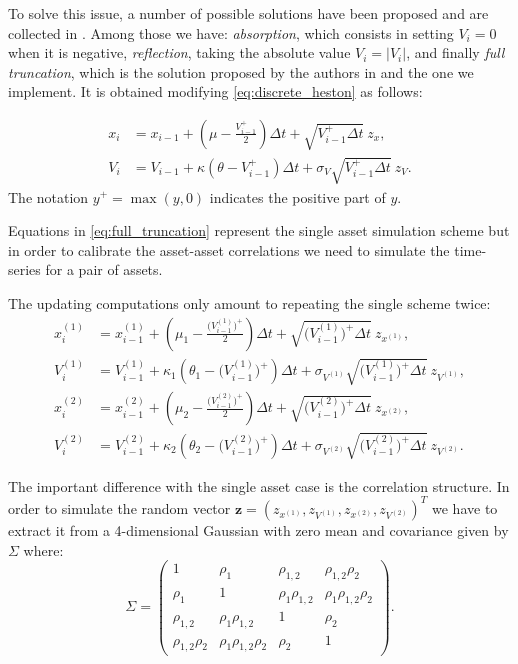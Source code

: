 To solve this issue, a number of possible solutions have been proposed and are collected in \citep{LORD2010}. Among those we have:
\textit{absorption}, which consists in setting $V_i = 0$ when it is negative, \textit{reflection}, taking the absolute value $V_i = |V_i|$, and finally \textit{full truncation}, which is the solution proposed  by the authors in \citep{LORD2010} and the one we  implement. It is obtained modifying \eqref{eq:discrete_heston} as follows:

\begin{subequations}
	\label{eq:full_truncation}
	\begin{align}
	x_i &= x_{i-1} + (\mu -  \frac{V_{i-1}^+}{2})\Delta t + \sqrt{V_{i-1}^+ \Delta t} \:z_x, \\
	V_i &= V_{i-1} + \kappa(\theta - V_{i-1}^+ )\Delta t + \sigma_V \sqrt{V_{i-1}^+ \Delta t} \: z_V.
	\end{align}
\end{subequations}
The notation $y^+ = \max(y, 0)$ indicates the positive part of $y$. 

Equations in \eqref{eq:full_truncation} represent the single asset simulation scheme but in order to calibrate the asset-asset correlations we need to simulate the time-series for a pair of assets.

The updating computations only amount to repeating the single scheme twice:
\begin{subequations}
	\label{eq:full_truncation2}
	\begin{align}
	x_i^{(1)} &= x_{i-1}^{(1)} + (\mu_1 -  \frac{\Big(V_{i-1}^{(1)}\Big)^+}{2})\Delta t + \sqrt{\Big(V_{i-1}^{(1)}\Big)^+ \Delta t} \:z_{x^{(1)}}, \\
	V_i^{(1)} &= V_{i-1}^{(1)} + \kappa_1(\theta_1 - \Big(V_{i-1}^{(1)}\Big)^+ )\Delta t + \sigma_{V^{(1)}} \sqrt{\Big(V_{i-1}^{(1)}\Big)^+ \Delta t} \: z_{V^(1)},\\
	x_i^{(2)} &= x_{i-1}^{(2)} + (\mu_2 -  \frac{\Big(V_{i-1}^{(2)}\Big)^+}{2})\Delta t + \sqrt{\Big(V_{i-1}^{(2)}\Big)^+\Delta t} \:z_{x^{(2)}}, \\
	V_i^{(2)} &= V_{i-1}^{(2)} + \kappa_2(\theta_2 - \Big(V_{i-1}^{(2)}\Big)^+ )\Delta t + \sigma_{V^{(2)}} \sqrt{\Big(V_{i-1}^{(2)}\Big)^+ \Delta t} \: z_{V^{(2)}}.
	\end{align}
\end{subequations}

The important difference with the single asset case is the correlation structure. In order to simulate the random vector $\mathbf{z} = (z_{x^{(1)}}, z_{V^{(1)}}, z_{x^{(2)}}, z_{V^{(2)}})^T$ we have to extract it from a 4-dimensional Gaussian with zero mean and covariance given by $\Sigma$ where:
\begin{equation}
\label{eq:corr_matrix}
	\Sigma = \begin{pmatrix}
	1 	& \rho_1 & \rho_{1,2} & \rho_{1,2} \rho_2\\
	\rho_1 & 1 & \rho_1 \rho_{1,2} & \rho_1 \rho_{1,2} \rho_2\\
	 \rho_{1,2} & \rho_1 \rho_{1,2}  & 1 & \rho_2 \\
	 \rho_{1,2} \rho_2 & \rho_1 \rho_{1,2} \rho_2&\rho_2  & 1
	\end{pmatrix}.
\end{equation}

